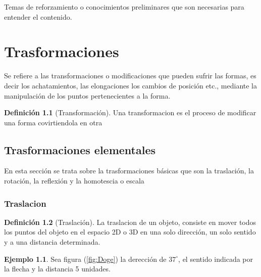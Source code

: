 \documentclass[
  16pt,
]{krantz}
\theoremstyle{definition}
\newtheorem{definition}{Definición}[chapter]
\theoremstyle{definition}
\newtheorem{example}{Ejemplo}[chapter]
\theoremstyle{definition}
\theoremstyle{definition}
\theoremstyle{remark}
\begin{document}
\hypertarget{appendix-apendice}{%
\appendix {}}


Temas de reforzamiento o conocimientos preliminares que son necesarias para entender el contenido.

\hypertarget{trasformaciones}{%
\chapter{Trasformaciones}\label{trasformaciones}}

Se refiere a las transformaciones o modificaciones que pueden sufrir las formas, es decir los achatamientos, las elongaciones los cambios de posición etc., mediante la manipulación de los puntos pertenecientes a la forma.

\begin{definition}[Transformación]
\protect\hypertarget{def:transformacion}{}\label{def:transformacion}Una transformacion es el proceso de modificar una forma covirtiendola en otra
\end{definition}

\hypertarget{trasformaciones-elementales}{%
\section{Trasformaciones elementales}\label{trasformaciones-elementales}}

En esta sección se trata sobre la trasformaciones básicas que son la traslación, la rotación, la reflexión y la homotescia o escala

\hypertarget{traslacion}{%
\subsection{Traslacion}\label{traslacion}}

\begin{definition}[Traslación]
\protect\hypertarget{def:traslacion}{}\label{def:traslacion}La traslacion de un objeto, consiste en mover todos los puntos del objeto en el espacio 2D o 3D en una solo dirección, un solo sentido y a una distancia determinada.
\end{definition}

\begin{example}
\protect\hypertarget{exm:unnamed-chunk-2}{}\label{exm:unnamed-chunk-2}Sea figura (\ref{fig:Doge}) la derección de \(37^\circ\), el sentido indicada por la flecha y la distancia 5 unidades.
\end{example}
\end{document}
